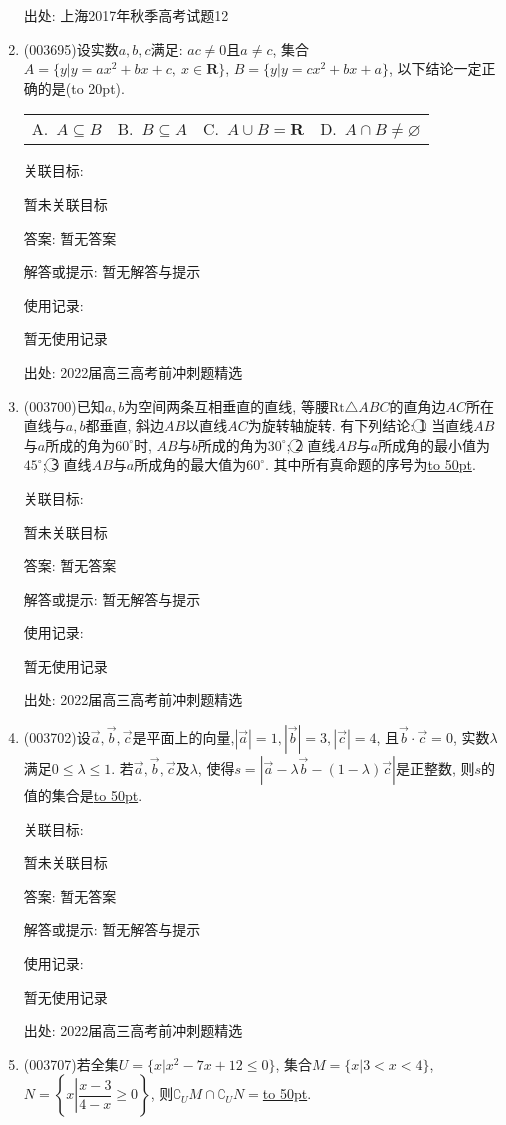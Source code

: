 \documentclass[10pt,a4paper]{article}
\newcommand{\blank}[1]{\underline{\hbox to #1pt{}}}
\newcommand{\bracket}[1]{(\hbox to #1pt{})}
\newcommand{\fourch}[4]{\par\begin{tabular}{p{.23\textwidth}p{.23\textwidth}p{.23\textwidth}p{.23\textwidth}}
A.~#1 &B.~#2& C.~#3& D.~#4
\end{tabular}}
\begin{document}
\begin{enumerate}[1.]
出处: 上海2017年秋季高考试题12
\item { (003695)}设实数$a,b,c$满足: $ac\ne 0$且$a\ne c$, 集合$A=\{y|y=ax^2+bx+c, \ x\in \mathbf{R}\}$, $B=\{y|y=cx^2+bx+a\}$, 以下结论一定正确的是\bracket{20}.
\fourch{$A\subseteq B$}{$B\subseteq A$}{$A\cup B=\mathbf{R}$}{$A\cap B\ne\varnothing$}


关联目标:

暂未关联目标

答案: 暂无答案

解答或提示: 暂无解答与提示

使用记录:

暂无使用记录


出处: 2022届高三高考前冲刺题精选
\item { (003700)}已知$a,b$为空间两条互相垂直的直线, 等腰$\mathrm{Rt}\triangle ABC$的直角边$AC$所在直线与$a,b$都垂直, 斜边$AB$以直线$AC$为旋转轴旋转. 有下列结论: \textcircled{1} 当直线$AB$与$a$所成的角为$60^\circ$时, $AB$与$b$所成的角为$30^\circ$; \textcircled{2} 直线$AB$与$a$所成角的最小值为$45^\circ$; \textcircled{3} 直线$AB$与$a$所成角的最大值为$60^\circ$. 其中所有真命题的序号为\blank{50}.


关联目标:

暂未关联目标

答案: 暂无答案

解答或提示: 暂无解答与提示

使用记录:

暂无使用记录


出处: 2022届高三高考前冲刺题精选
\item { (003702)}设$\overrightarrow a,\overrightarrow b,\overrightarrow c$是平面上的向量,$|\overrightarrow a| =1,|\overrightarrow b| =3,|\overrightarrow c|=4$, 且$\overrightarrow b\cdot \overrightarrow c=0$, 实数$\lambda$满足$0 \le \lambda \le 1$. 若$\overrightarrow a,\overrightarrow b,\overrightarrow c$及$\lambda$, 使得$s=|\overrightarrow a-\lambda \overrightarrow b-(1-\lambda)\overrightarrow c|$是正整数, 则$s$的值的集合是\blank{50}.


关联目标:

暂未关联目标

答案: 暂无答案

解答或提示: 暂无解答与提示

使用记录:

暂无使用记录


出处: 2022届高三高考前冲刺题精选
\item { (003707)}若全集$U=\{x|x^2-7x+12\le 0\}$, 集合$M=\{x|3<x<4\}$, $N=\left\{x\left|\dfrac{x-3}{4-x}\ge 0\right.\right\}$, 则$\complement_U M\cap \complement_U N=$\blank{50}.



\end{enumerate}
\end{document}
